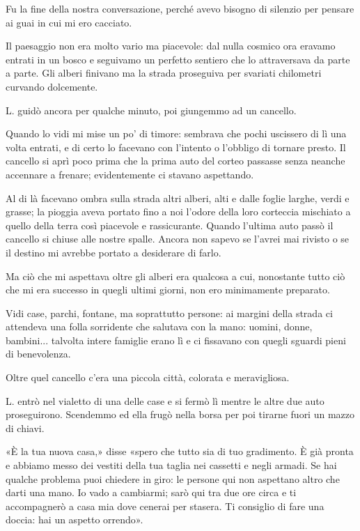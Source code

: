 \documentclass[a4paper,12pt]{book}
\begin{document}
Fu la fine della nostra conversazione, perché avevo bisogno di silenzio per
pensare ai guai in cui mi ero cacciato.

Il paesaggio non era molto vario ma piacevole: dal nulla cosmico ora eravamo
entrati in un bosco e seguivamo un perfetto sentiero che lo attraversava da
parte a parte. Gli alberi finivano ma la strada proseguiva per svariati chilometri
curvando dolcemente.

L. guidò ancora per qualche minuto, poi giungemmo ad un cancello.

Quando lo vidi mi mise un po' di timore: sembrava che pochi uscissero di lì
una volta entrati, e di certo lo facevano con l'intento o l'obbligo di
tornare presto. Il cancello si aprì poco prima che la prima auto del corteo
passasse senza neanche accennare a frenare; evidentemente ci stavano aspettando.

Al di là facevano ombra sulla strada altri alberi, alti e dalle foglie larghe,
verdi e grasse; la pioggia aveva portato fino a noi l'odore della loro corteccia
mischiato a quello della terra così piacevole e rassicurante. Quando l'ultima
auto passò il cancello si chiuse alle nostre spalle. Ancora non sapevo se
l'avrei mai rivisto o se il destino mi avrebbe portato a desiderare di farlo.

Ma ciò che mi aspettava oltre gli alberi era qualcosa a cui, nonostante tutto
ciò che mi era successo in quegli ultimi giorni, non ero minimamente preparato.

Vidi case, parchi, fontane, ma soprattutto persone: ai margini della strada ci
attendeva una folla sorridente che salutava con la mano: uomini, donne, bambini...
talvolta intere famiglie erano lì e ci fissavano con quegli sguardi pieni di
benevolenza.

Oltre quel cancello c'era una piccola città, colorata e meravigliosa.

L. entrò nel vialetto di una delle case e si fermò lì mentre le altre due
auto proseguirono. Scendemmo ed ella frugò nella borsa per poi tirarne fuori un
mazzo di chiavi.

«È la tua nuova casa,» disse «spero che tutto sia di tuo gradimento. È già
pronta e abbiamo messo dei vestiti della tua taglia nei cassetti e negli
armadi. Se hai qualche problema puoi chiedere in giro: le persone qui non
aspettano altro che darti una mano. Io vado a cambiarmi; sarò qui tra due ore
circa e ti accompagnerò a casa mia dove cenerai per stasera. Ti consiglio di
fare una doccia: hai un aspetto orrendo».
\end{document}
